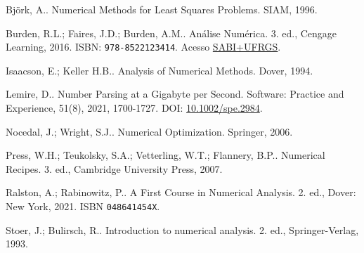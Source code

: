 \documentclass[12pt]{book}
\begin{document}
\begin{thebibliography}{99}
  Björk, A.. Numerical Methods for Least Squares Problems. SIAM, 1996.

  Burden, R.L.; Faires, J.D.; Burden, A.M.. Análise Numérica. 3. ed., Cengage Learning, 2016. ISBN: \texttt{978-8522123414}. Acesso \href{https://bit.ly/3XB54MJ}{SABI+UFRGS}.

  Isaacson, E.; Keller H.B.. Analysis of Numerical Methods. Dover, 1994.

  Lemire, D.. Number Parsing at a Gigabyte per Second. Software: Practice and Experience, 51(8), 2021, 1700-1727. DOI: \href{https://doi.org/10.1002/spe.2984}{10.1002/spe.2984}.

  Nocedal, J.; Wright, S.J.. Numerical Optimization. Springer, 2006.

  Press, W.H.; Teukolsky, S.A.; Vetterling, W.T.; Flannery, B.P.. Numerical Recipes. 3. ed., Cambridge University Press,
2007.

  Ralston, A.; Rabinowitz, P.. A First Course in Numerical Analysis. 2. ed., Dover: New York, 2021. ISBN \texttt{048641454X}.

  Stoer, J.; Bulirsch, R.. Introduction to numerical analysis. 2. ed., Springer-Verlag, 1993.
\end{thebibliography}
\end{document}
